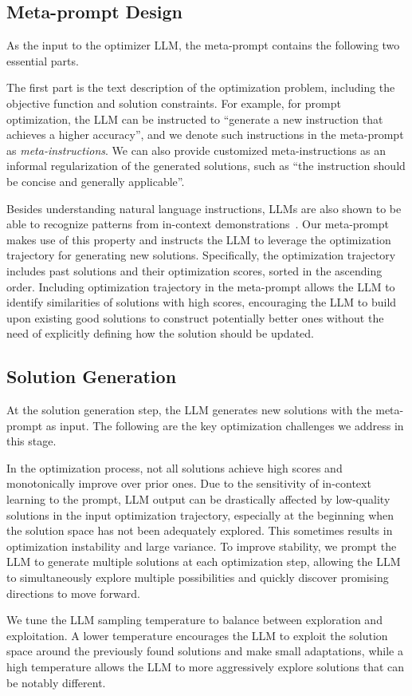 \subsection{Meta-prompt Design}

As the input to the optimizer LLM, the meta-prompt contains the following two essential parts.

The first part is the text description of the optimization problem, including the objective function and solution constraints. 
For example, for prompt optimization, the LLM can be instructed to ``generate a new instruction that achieves a higher accuracy'', and we denote such instructions in the meta-prompt as \emph{meta-instructions}. 
We can also provide customized meta-instructions as an informal regularization of the generated solutions, such as ``the instruction should be concise and generally applicable''.

Besides understanding natural language instructions, LLMs are also shown to be able to recognize patterns from in-context demonstrations~\citep{wei2023larger,madaan2022text,mirchandani2023large}. 
Our meta-prompt makes use of this property and instructs the LLM to leverage the optimization trajectory for generating new solutions. 
Specifically, the optimization trajectory includes past solutions and their optimization scores, sorted in the ascending order. 
Including optimization trajectory in the meta-prompt allows the LLM to identify similarities of solutions with high scores, encouraging the LLM to build upon existing good solutions to construct potentially better ones without the need of explicitly defining how the solution should be updated.

\subsection{Solution Generation}

At the solution generation step, the LLM generates new solutions with the meta-prompt as input. 
The following are the key optimization challenges we address in this stage.

 In the optimization process, not all solutions achieve high scores and monotonically improve over prior ones. 
Due to the sensitivity of in-context learning to the prompt, LLM output can be drastically affected by low-quality solutions in the input optimization trajectory, especially at the beginning when the solution space has not been adequately explored. 
This sometimes results in optimization instability and large variance. 
To improve stability, we prompt the LLM to generate multiple solutions at each optimization step, allowing the LLM to simultaneously explore multiple possibilities and quickly discover promising directions to move forward.

We tune the LLM sampling temperature to balance between exploration and exploitation. 
A lower temperature encourages the LLM to exploit the solution space around the previously found solutions and make small adaptations, while a high temperature allows the LLM to more aggressively explore solutions that can be notably different.